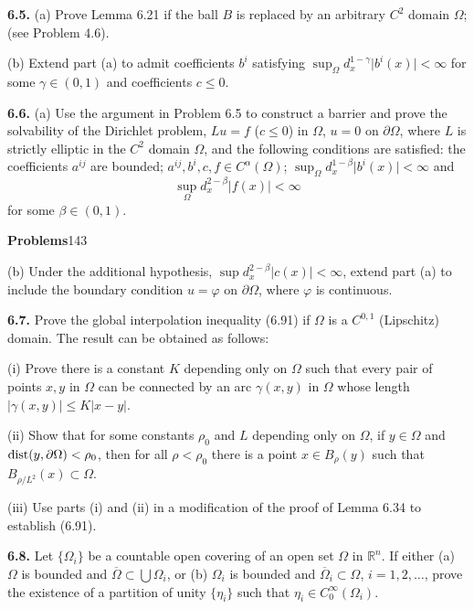 \medskip

\noindent \textbf{6.5.} (a) Prove Lemma 6.21 if the ball $B$ is replaced by an arbitrary $C^2$ domain
$\Omega$; (see Problem 4.6).

\noindent \hspace*{1.5em} (b) Extend part (a) to admit coefficients $b^i$ satisfying $\sup_\Omega d_x^{1-\gamma}\lvert b^i(x)\rvert < \infty$ for
some $\gamma \in (0,1)$ and coefficients $c \leq 0$.

\medskip

\noindent \textbf{6.6.} (a) Use the argument in Problem 6.5 to construct a barrier and prove the
solvability of the Dirichlet problem, $Lu=f$ ($c \leq 0$) in $\Omega$, $u = 0$ on $\partial\Omega$, where $L$ is
strictly elliptic in the $C^2$ domain $\Omega$, and the following conditions are satisfied:
the coefficients $a^{ij}$ are bounded; $a^{ij}, b^i, c, f \in C^\alpha(\Omega)$; $\sup_\Omega d_x^{1-\beta}\lvert b^i(x)\rvert < \infty$ and
\[
  \sup_\Omega d_x^{2-\beta}\lvert f(x)\rvert < \infty
\]
for some $\beta \in (0,1)$.



{\bf Problems}\hfill 143

\medskip

(b) Under the additional hypothesis, $\sup d_x^{2-\beta}|c(x)|<\infty$, extend part (a) to include the boundary condition $u=\varphi$ on $\partial\Omega$, where $\varphi$ is continuous.

\medskip

{\bf 6.7.} Prove the global interpolation inequality (6.91) if $\Omega$ is a $C^{0,1}$ (Lipschitz) domain. The result can be obtained as follows:

\medskip

\noindent
(i) Prove there is a constant $K$ depending only on $\Omega$ such that every pair of points $x, y$ in $\Omega$ can be connected by an arc $\gamma(x,y)$ in $\Omega$ whose length $|\gamma(x,y)| \le K|x-y|$.

\noindent
(ii) Show that for some constants $\rho_0$ and $L$ depending only on $\Omega$, if $y\in\Omega$ and $\operatorname{dist}(y,\partial\Omega)<\rho_0$, then for all $\rho<\rho_0$ there is a point $x\in B_\rho(y)$ such that $B_{\rho/L^2}(x)\subset \Omega$.

\noindent
(iii) Use parts (i) and (ii) in a modification of the proof of Lemma 6.34 to establish (6.91).

\medskip

{\bf 6.8.} Let $\{\Omega_i\}$ be a countable open covering of an open set $\Omega$ in $\mathbb{R}^n$. If either
(a) $\Omega$ is bounded and $\overline{\Omega}\subset \bigcup \Omega_i$, or (b) $\Omega_i$ is bounded and $\overline{\Omega}_i\subset\Omega$, $i=1,2,\dots$, prove the existence of a partition of unity $\{\eta_i\}$ such that $\eta_i\in C_0^\infty(\Omega_i)$.

